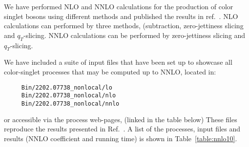 \label{sec:scetqt}
We have performed NLO and NNLO calculations for the production of
color singlet bosons using different methods and published the results in ref.~\cite{Campbell:2022gdq}.
NLO calculations can performed by three methods, (subtraction, zero-jettiness slicing and $q_T$-slicing.
NNLO calculations can be performed by zero-jettiness slicing and $q_T$-slicing.


We have included a suite of input files that have been set up
to showcase all color-singlet processes that may be computed up to NNLO, located
in:
\begin{verbatim}
     Bin/2202.07738_nonlocal/lo
     Bin/2202.07738_nonlocal/nlo
     Bin/2202.07738_nonlocal/nnlo
\end{verbatim}
or accessible via the process web-pages, (linked in the table below)
These files reproduce the results presented in Ref.~\cite{Campbell:2022gdq}.
A list of the processes, input files and results (NNLO coefficient and running time)
is shown in Table~\ref{table:nnlo10}.

